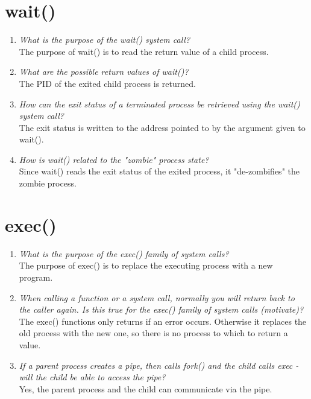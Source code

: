 \documentclass[a4paper]{article}
\begin{document}
\section{wait()}
\begin{enumerate}
  \item \textit{What is the purpose of the wait() system call?} \\
    The purpose of wait() is to read the return value of a child process.
  \item \textit{What are the possible return values of wait()?} \\
    The PID of the exited child process is returned.
  \item \textit{How can the exit status of a terminated process be retrieved using the wait() system call?} \\
    The exit status is written to the address pointed to by the argument given to wait().
  \item \textit{How is wait() related to the  "zombie" process state?} \\
    Since wait() reads the exit status of the exited process, it "de-zombifies" the zombie process.
\end{enumerate}

\section{exec()}
\begin{enumerate}
  \item \textit{What is the purpose of the exec() family of system calls?} \\
    The purpose of exec() is to replace the executing process with a new program.
  \item \textit{When calling a function or a system call, normally you will return back to the caller again. Is this true for the exec() family of system calls (motivate)?} \\
    The exec() functions only returns if an error occurs. Otherwise it replaces the old process with the new one, so there is no process to which to return a value.
  \item \textit{If a parent process creates a pipe, then calls fork() and the child calls exec - will the child be able to access the pipe?} \\
    Yes, the parent process and the child can communicate via the pipe.

\end{enumerate}
\end{document}

